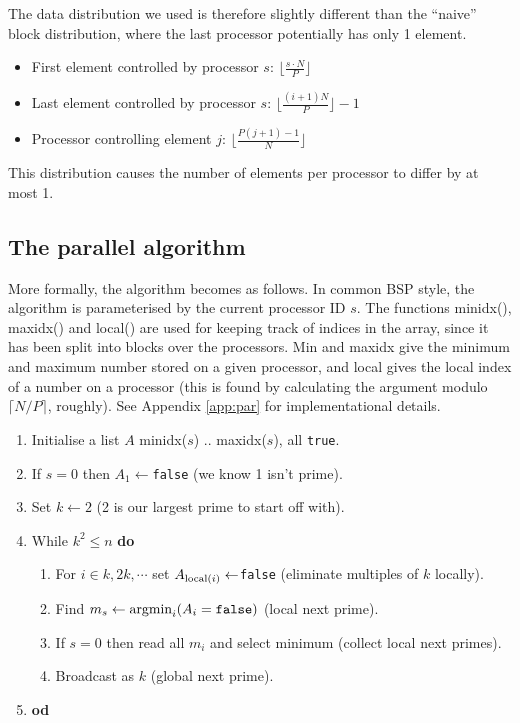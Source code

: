 \documentclass[a4paper]{article}
\begin{document}
The data distribution we used is therefore slightly different than the ``naive''
block distribution, where the last processor potentially has only 1 element. 

\begin{itemize}
    \item First element controlled by processor $s$: $\lfloor \frac{s\cdot
        N}{P} \rfloor$
    \item Last element controlled by processor $s$: $\lfloor
        \frac{(i+1)N}{P} \rfloor -1$
    \item Processor controlling element $j$: $\lfloor \frac{P(j+1) -1}{N} \rfloor$
\end{itemize}

This distribution causes the number of elements per processor to differ by at
most 1. 

\subsection{The parallel algorithm}

More formally, the algorithm becomes as follows. In common BSP style, the
algorithm is parameterised by the current processor ID $s$. The functions
minidx(), maxidx() and local() are used for keeping track of indices in the
array, since it has been split into blocks over the processors. Min and maxidx
give the minimum and maximum number stored on a given processor, and local gives
the local index of a number on a processor (this is found by calculating the
argument modulo $\lceil N/P \rceil$, roughly). See Appendix \ref{app:par} for
implementational details. 

\begin{enumerate}
    \item Initialise a list $A$ minidx($s$) .. maxidx($s$), all \texttt{true}.
    \item If $s=0$ then $A_1 \leftarrow $\texttt{false} (we know 1 isn't prime).
    \item Set $k\leftarrow 2$ (2 is our largest prime to start off with).
    \item While $k^2 \le n$ \textbf{do}
        \begin{enumerate}
            \item For $i \in {k, 2 k, \cdots }$ set $A_{\textnormal{local}(i)} \leftarrow
                $\texttt{false} (eliminate multiples of $k$ locally).
            \item Find $m_s \leftarrow \displaystyle \textnormal{argmin}_{i}
                (A_i = \texttt{false})$ (local next prime).
            \item If $s=0$ then read all $m_i$ and select minimum (collect local
                next primes).
            \item Broadcast as $k$ (global next prime).
        \end{enumerate}
    \item \textbf{od}
\end{enumerate}
\end{document}
